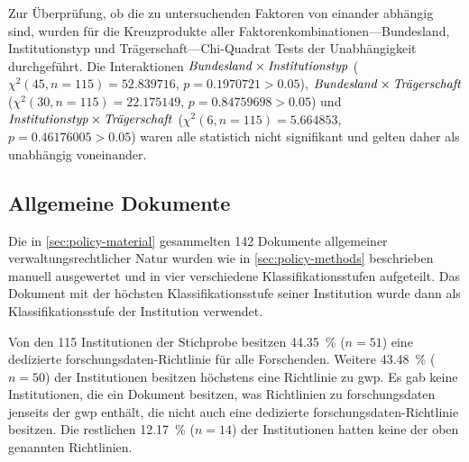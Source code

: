Zur Überprüfung, ob die zu untersuchenden Faktoren von einander abhängig sind, wurden für die Kreuzprodukte aller Faktorenkombinationen---Bundesland, Institutionstyp und Trägerschaft---Chi-Quadrat Tests der Unabhängigkeit durchgeführt.
Die Interaktionen $\text{\textit{Bundesland}}\times\text{\textit{Institutionstyp}}$ ($\chi^2 (\num{45}, n=\num{115}) = \num[round-mode=places,round-precision=2]{52,839716}$, $p = \num[round-mode=places,round-precision=2]{0,1970721}>\num{0.05}$), $\text{\textit{Bundesland}}\times\text{\textit{Trägerschaft}}$ ($\chi^2 (\num{30}, n=\num{115}) = \num[round-mode=places,round-precision=2]{22,175149}$, $p = \num[round-mode=places,round-precision=2]{0,84759698}>\num{0.05}$) und $\text{\textit{Institutionstyp}}\times\text{\textit{Trägerschaft}}$ ($\chi^2 (\num{6}, n=\num{115}) = \num[round-mode=places,round-precision=2]{5,664853}$, $p = \num[round-mode=places,round-precision=2]{0,46176005}>\num{0.05}$) waren alle statistich nicht signifikant und gelten daher als unabhängig voneinander.

\subsection{Allgemeine Dokumente}\label{sec:policy-results-general}
Die in \cref{sec:policy-material} gesammelten \num{142} Dokumente allgemeiner verwaltungsrechtlicher Natur wurden wie in \cref{sec:policy-methods} beschrieben manuell ausgewertet und in vier verschiedene Klassifikationsstufen aufgeteilt.
Das Dokument mit der höchsten Klassifikationsstufe seiner Institution wurde dann als Klassifikationsstufe der Institution verwendet.

Von den \num{115} Institutionen der Stichprobe besitzen \SI{44,35}{\percent} ($n=\num{51}$) eine dedizierte \gls{forschungsdaten}-Richtlinie für alle Forschenden.
Weitere \SI{43,48}{\percent} ($n=\num{50}$) der Institutionen besitzen höchstens eine Richtlinie zu \gls{gwp}.
Es gab keine Institutionen, die ein Dokument besitzen, was Richtlinien zu \gls{forschungsdaten} jenseits der \gls{gwp} enthält, die nicht auch eine dedizierte \gls{forschungsdaten}-Richtlinie besitzen.
Die restlichen \SI{12,17}{\percent} ($n=\num{14}$) der Institutionen hatten keine der oben genannten Richtlinien.

